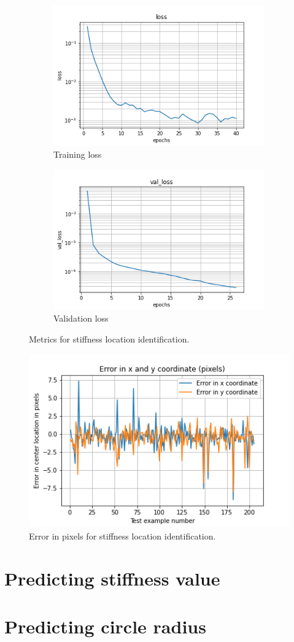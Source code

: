 \documentclass{article}
\begin{document}
\begin{figure}
\centering
\begin{subfigure}[b]{0.45\textwidth}
    \centering
    \includegraphics[totalheight=4cm]{circle_id/location/plotloss.png}
    \caption{Training loss}
  \end{subfigure}
%
\begin{subfigure}[b]{0.45\textwidth}
    \centering
    \includegraphics[totalheight=4cm]{circle_id/binary/plotval_loss.png}
    \caption{Validation loss}
  \end{subfigure}
%
\caption{\label{fig:locationmetrics} Metrics for stiffness location identification.}
\end{figure}
%
\begin{figure}
\centering
\includegraphics{circle_id/location/plotabserror.png}
\caption{\label{fig:locationerror} Error in pixels for stiffness location identification.}
\end{figure}

\section{Predicting stiffness value}
%
\section{Predicting circle radius}
%
\end{document}
